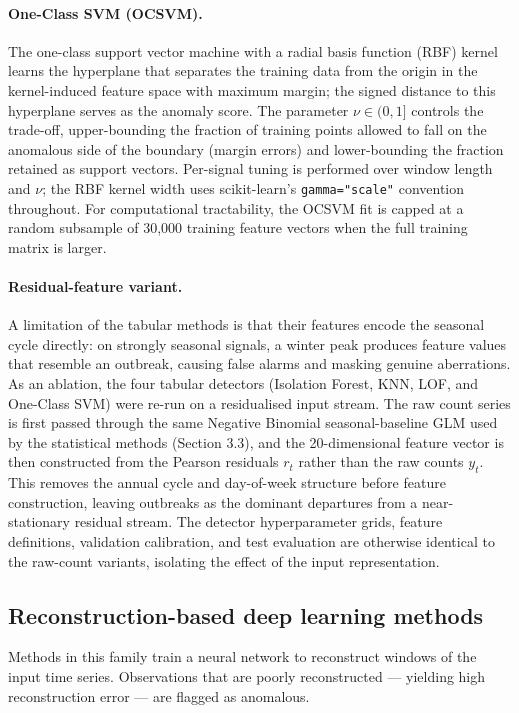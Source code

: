 \documentclass[11pt]{article}
\begin{document}
\paragraph{One-Class SVM (OCSVM).} The one-class support vector machine \citep{scholkopf2001} with a radial basis function (RBF) kernel learns the hyperplane that separates the training data from the origin in the kernel-induced feature space with maximum margin; the signed distance to this hyperplane serves as the anomaly score. The parameter $\nu \in (0,1]$ controls the trade-off, upper-bounding the fraction of training points allowed to fall on the anomalous side of the boundary (margin errors) and lower-bounding the fraction retained as support vectors. Per-signal tuning is performed over window length and $\nu$; the RBF kernel width uses scikit-learn's \texttt{gamma="scale"} convention throughout. For computational tractability, the OCSVM fit is capped at a random subsample of 30,000 training feature vectors when the full training matrix is larger.

\paragraph{Residual-feature variant.} A limitation of the tabular methods is that their features encode the seasonal cycle directly: on strongly seasonal signals, a winter peak produces feature values that resemble an outbreak, causing false alarms and masking genuine aberrations. As an ablation, the four tabular detectors (Isolation Forest, KNN, LOF, and One-Class SVM) were re-run on a residualised input stream. The raw count series is first passed through the same Negative Binomial seasonal-baseline GLM used by the statistical methods (Section 3.3), and the 20-dimensional feature vector is then constructed from the Pearson residuals $r_t$ rather than the raw counts $y_t$. This removes the annual cycle and day-of-week structure before feature construction, leaving outbreaks as the dominant departures from a near-stationary residual stream. The detector hyperparameter grids, feature definitions, validation calibration, and test evaluation are otherwise identical to the raw-count variants, isolating the effect of the input representation.

\subsection{Reconstruction-based deep learning methods}

Methods in this family train a neural network to reconstruct windows of the input time series. Observations that are poorly reconstructed --- yielding high reconstruction error --- are flagged as anomalous.
\end{document}
